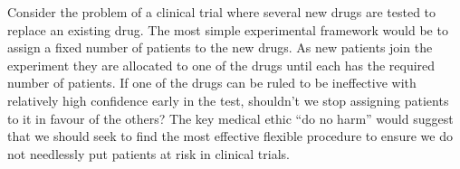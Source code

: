 





 
 


\par Consider the problem of a clinical trial where several new drugs are tested to replace an existing drug. The most simple experimental framework would be to assign a fixed number of patients to the new drugs.  As new patients join the experiment they are allocated to one of the drugs until each has the required number of patients. If one of the drugs can be ruled to be ineffective with relatively high confidence early in the test, shouldn't we stop assigning patients to it in favour of the others? The key medical ethic ``do no harm'' would suggest that we should seek to find the most effective flexible procedure to ensure we do not needlessly put patients at risk in clinical trials. 







%












